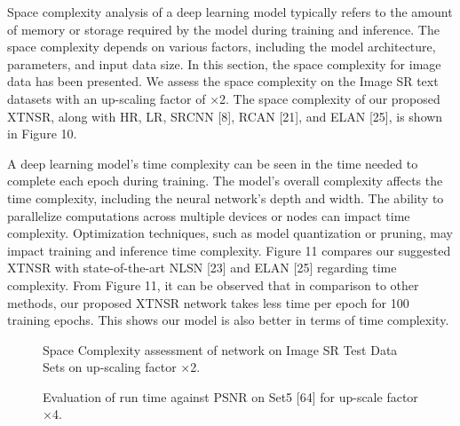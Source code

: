\documentclass[twocolumn]{svjour3}          %
\begin{document}
Space complexity analysis of a deep learning model typically refers to the amount of memory or storage required by the model during training and inference. The space complexity depends on various factors, including the model architecture, parameters, and input data size. In this section, the space complexity for image data has been presented. We assess the space complexity on the Image SR text datasets with an up-scaling factor of ×2. The space complexity of our proposed XTNSR, along with HR, LR, SRCNN [8], RCAN [21], and ELAN [25], is shown in Figure 10. 

A deep learning model's time complexity can be seen in the time needed to complete each epoch during training. The model's overall complexity affects the time complexity, including the neural network's depth and width. The ability to parallelize computations across multiple devices or nodes can impact time complexity. Optimization techniques, such as model quantization or pruning, may impact training and inference time complexity. Figure 11 compares our suggested XTNSR with state-of-the-art NLSN [23] and ELAN [25] regarding time complexity. From Figure 11, it can be observed that in comparison to other methods, our proposed XTNSR network takes less time per epoch for 100 training epochs. This shows our model is also better in terms of time complexity.

\begin{figure}
  \centering
   \caption {Space Complexity assessment of network on Image SR Test Data Sets on up-scaling factor  ×2.}
    \label{fig:10}
\end{figure}

\begin{figure}
  \centering
   \caption {Evaluation of run time against PSNR on Set5 [64] for up-scale factor ×4.}
    \label{fig:11}
\end{figure}
\end{document}
